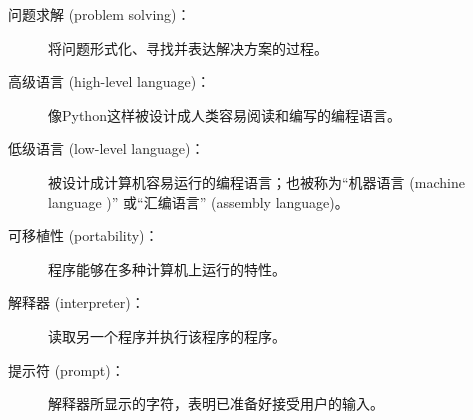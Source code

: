 \begin{description}


\item[问题求解 (problem solving)：]  将问题形式化、寻找并表达解决方案的过程。
  


\item[高级语言 (high-level language)：]  像Python这样被设计成人类容易阅读和编写的编程语言。
  


\item[低级语言 (low-level language)：]  被设计成计算机容易运行的编程语言；也被称为``机器语言 (machine language )'' 或``汇编语言'' (assembly language)。
  


\item[可移植性 (portability)：]  程序能够在多种计算机上运行的特性。
  


\item[解释器 (interpreter)：]  读取另一个程序并执行该程序的程序。
  


\item[提示符 (prompt)：] 解释器所显示的字符，表明已准备好接受用户的输入。
  


\end{description}
